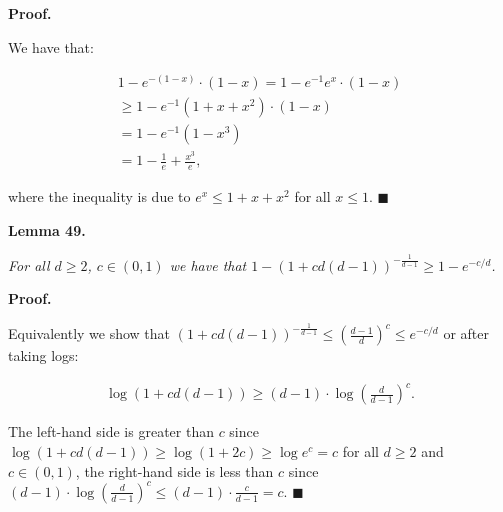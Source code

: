 


\par\medskip\noindent\textbf{Proof.}\par



We have that:\par


\[\begin{gathered}
\displaystyle 1-e^{-(1-x)}\cdot(1-x) \displaystyle=1-e^{-1}e^{x}\cdot(1-x) \\
\displaystyle\geq 1-e^{-1}(1+x+x^{2})\cdot(1-x) \\
\displaystyle=1-e^{-1}(1-x^{3}) \\
\displaystyle=1-\frac{1}{e}+\frac{x^{3}}{e},
\end{gathered}\]


where the inequality is due to $e^{x}\leq 1+x+x^{2}$ for all $x\leq 1$.
\ensuremath{\blacksquare}\par






\par\medskip\noindent\textbf{\textbf{Lemma 49}\textbf{.}}\par



\emph{For all $d\geq 2$, $c\in(0,1)$ we have that $1-\left(1+cd(d-1)\right)^{-\frac{1}{d-1}}\geq 1-e^{-c/d}$.}\par






\par\medskip\noindent\textbf{Proof.}\par



Equivalently we show that $\left(1+cd(d-1)\right)^{-\frac{1}{d-1}}\leq\left(\frac{d-1}{d}\right)^{c}\leq e^{-c/d}$ or after taking logs:\par


\[\begin{gathered}
\displaystyle\log\left(1+cd(d-1)\right)\geq(d-1)\cdot\log\left(\frac{d}{d-1}\right)^{c}.
\end{gathered}\]


The left-hand side is greater than $c$ since $\log\left(1+cd(d-1)\right)\geq\log\left(1+2c\right)\geq\log{e^{c}}=c$ for all $d\geq 2$ and $c\in(0,1)$, the right-hand side is less than $c$ since $(d-1)\cdot\log\left(\frac{d}{d-1}\right)^{c}\leq(d-1)\cdot\frac{c}{d-1}=c$.
\ensuremath{\blacksquare}\par






